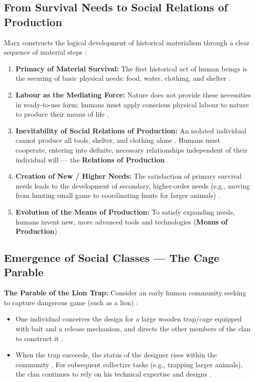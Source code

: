 \subsection{From Survival Needs to Social Relations of Production}

Marx constructs the logical development of historical materialism through a clear sequence of material steps :
\begin{enumerate}
    \item \textbf{Primacy of Material Survival:} The first historical act of human beings is the securing of basic physical needs: food, water, clothing, and shelter .
    \item \textbf{Labour as the Mediating Force:} Nature does not provide these necessities in ready-to-use form; humans must apply conscious physical labour to nature to produce their means of life .
    \item \textbf{Inevitability of Social Relations of Production:} An isolated individual cannot produce all tools, shelter, and clothing alone . Humans must cooperate, entering into definite, necessary relationships independent of their individual will --- the \textbf{Relations of Production} .
    \item \textbf{Creation of New / Higher Needs:} The satisfaction of primary survival needs leads to the development of secondary, higher-order needs (e.g., moving from hunting small game to coordinating hunts for larger animals) .
    \item \textbf{Evolution of the Means of Production:} To satisfy expanding needs, humans invent new, more advanced tools and technologies (\textbf{Means of Production}) .
\end{enumerate}

\subsection{Emergence of Social Classes --- The Cage Parable}

\begin{ExampleBox}
\textbf{The Parable of the Lion Trap:}
Consider an early human community seeking to capture dangerous game (such as a lion) :
\begin{itemize}
    \item One individual conceives the design for a large wooden trap/cage equipped with bait and a release mechanism, and directs the other members of the clan to construct it .
    \item When the trap succeeds, the status of the designer rises within the community . For subsequent collective tasks (e.g., trapping larger animals), the clan continues to rely on his technical expertise and designs .
\end{itemize}
\end{ExampleBox}

